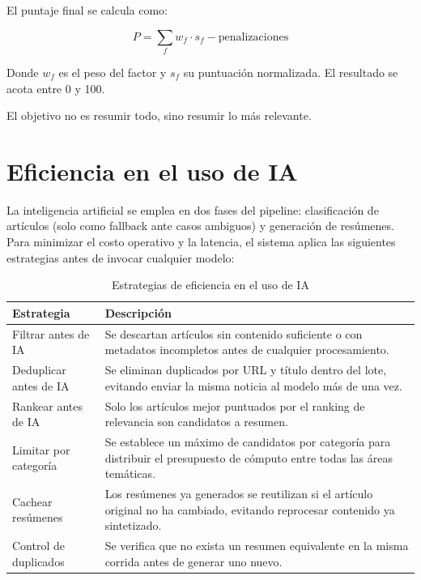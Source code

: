 El puntaje final se calcula como:

\begin{equation}
P = \sum_{f} w_f \cdot s_f - \text{penalizaciones}
\end{equation}

Donde $w_f$ es el peso del factor y $s_f$ su puntuaci\'on normalizada. El resultado se acota entre 0 y 100.

El objetivo no es resumir todo, sino resumir lo m\'as relevante.

\section{Eficiencia en el uso de IA}

La inteligencia artificial se emplea en dos fases del pipeline: clasificaci\'on de art\'iculos (solo como fallback ante casos ambiguos) y generaci\'on de res\'umenes. Para minimizar el costo operativo y la latencia, el sistema aplica las siguientes estrategias antes de invocar cualquier modelo:

\begin{table}[H]
\centering
\begin{tabular}{lp{10cm}}
\toprule
\textbf{Estrategia} & \textbf{Descripci\'on} \\
\midrule
Filtrar antes de IA  & Se descartan art\'iculos sin contenido suficiente o con metadatos incompletos antes de cualquier procesamiento. \\
\midrule
Deduplicar antes de IA & Se eliminan duplicados por URL y t\'itulo dentro del lote, evitando enviar la misma noticia al modelo m\'as de una vez. \\
\midrule
Rankear antes de IA  & Solo los art\'iculos mejor puntuados por el ranking de relevancia son candidatos a resumen. \\
\midrule
Limitar por categor\'ia & Se establece un m\'aximo de candidatos por categor\'ia para distribuir el presupuesto de c\'omputo entre todas las \'areas tem\'aticas. \\
\midrule
Cachear res\'umenes  & Los res\'umenes ya generados se reutilizan si el art\'iculo original no ha cambiado, evitando reprocesar contenido ya sintetizado. \\
\midrule
Control de duplicados & Se verifica que no exista un resumen equivalente en la misma corrida antes de generar uno nuevo. \\
\bottomrule
\end{tabular}
\caption{Estrategias de eficiencia en el uso de IA}
\end{table}

